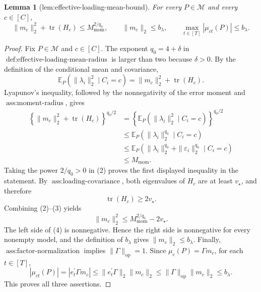 \documentclass{article}
\newtheorem{lemma}{Lemma}
\begin{document}
\begin{lemma}[lem:effective-loading-mean-bound]\label{lem:effective-loading-mean-bound}
For every \(P\in\mathcal M\) and every \(c\in[C]\),
\[
\|m_c\|_2^2+\operatorname{tr}(H_c)\le M_{\mathrm{mom}}^{2/q_0},
\qquad
\|m_c\|_2\le b_\lambda,
\qquad
\max_{t\in[T]}|\mu_{ct}(P)|\le b_\lambda.
\]
\end{lemma}
\begin{proof}
Fix \(P\in\mathcal M\) and \(c\in[C]\).  The exponent \(q_0=4+\delta\) in \(\operatorname{def:effective\text{-}loading\text{-}mean\text{-}radius}\) is larger than two because \(\delta>0\).  By the definition of the conditional mean and covariance,
\[
\mathbb E_P\!\left(\|\lambda_i\|_2^2\mid C_i=c\right)
=\|m_c\|_2^2+\operatorname{tr}(H_c).
\tag{1}
\]
Lyapunov's inequality, followed by the nonnegativity of the error moment and \(\operatorname{ass:moment\text{-}radius}\), gives
\[
\begin{aligned}
\left\{\|m_c\|_2^2+\operatorname{tr}(H_c)\right\}^{q_0/2}
&=\left\{\mathbb E_P(\|\lambda_i\|_2^2\mid C_i=c)\right\}^{q_0/2}\\
&\le \mathbb E_P(\|\lambda_i\|_2^{q_0}\mid C_i=c)\\
&\le \mathbb E_P(\|\lambda_i\|_2^{q_0}+\|\varepsilon_i\|_2^{q_0}\mid C_i=c)\\
&\le M_{\mathrm{mom}}.
\end{aligned}
\tag{2}
\]
Taking the power \(2/q_0>0\) in (2) proves the first displayed inequality in the statement.  By \(\operatorname{ass:loading\text{-}covariance}\), both eigenvalues of \(H_c\) are at least \(v_\star\), and therefore
\[
\operatorname{tr}(H_c)\ge 2v_\star.
\tag{3}
\]
Combining (2)--(3) yields
\[
\|m_c\|_2^2
\le M_{\mathrm{mom}}^{2/q_0}-2v_\star.
\tag{4}
\]
The left side of (4) is nonnegative.  Hence the right side is nonnegative for every nonempty model, and the definition of \(b_\lambda\) gives \(\|m_c\|_2\le b_\lambda\).  Finally, \(\operatorname{ass:factor\text{-}normalization}\) implies \(\|\Gamma\|_{\mathrm{op}}=1\).  Since \(\mu_c(P)=\Gamma m_c\), for each \(t\in[T]\),
\[
|\mu_{ct}(P)|
=|e_t^{\prime}\Gamma m_c|
\le \|e_t^{\prime}\Gamma\|_2\|m_c\|_2
\le \|\Gamma\|_{\mathrm{op}}\|m_c\|_2
\le b_\lambda.
\]
This proves all three assertions.
\end{proof}
\end{document}
